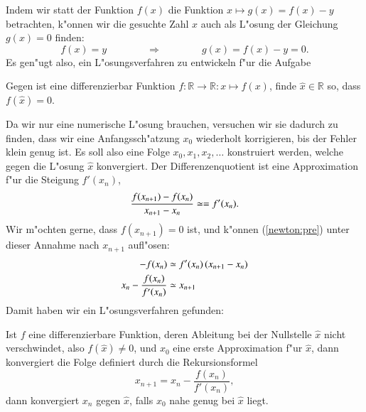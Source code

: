 Indem wir statt der Funktion $f(x)$ die Funktion $x\mapsto g(x)=f(x)-y$
betrachten, k"onnen wir die gesuchte Zahl $x$ auch als L"osung der
Gleichung $g(x)=0$ finden:
\begin{equation}
f(x)=y
\qquad\qquad
\Rightarrow
\qquad\qquad
g(x)=f(x)-y = 0.
\label{newton:reduktion}
\end{equation}
Es gen"ugt also, ein L"osungsverfahren zu entwickeln f"ur die Aufgabe
\begin{aufgabe}
Gegen ist eine differenzierbar Funktion
$f\colon\mathbb R\to\mathbb R:x\mapsto f(x)$,
finde $\hat{x}\in\mathbb R$ so, dass $f(\hat{x})=0$.
\end{aufgabe}
Da wir nur eine numerische L"osung brauchen, versuchen wir sie dadurch
zu finden, dass wir eine Anfangssch"atzung $x_0$ wiederholt korrigieren,
bis der Fehler klein genug ist.
Es soll also eine Folge $x_0,x_1,x_2,\dots$ konstruiert werden, welche
gegen die L"osung $\hat{x}$ konvergiert.
Der Differenzenquotient ist eine Approximation f"ur die Steigung
$f'(x_n)$,
\begin{equation}
\frac{
f(x_{\mathstrut n+1})-f(x_{\mathstrut n})
}{
x_{\mathstrut n+1}-x_{\mathstrut n}
}
\simeq = f'(x_n).
\label{newton:pre}
\end{equation}
Wir m"ochten gerne, dass $f(x_{n+1})=0$ ist, und k"onnen (\ref{newton:pre})
unter dieser Annahme nach $x_{n+1}$ aufl"osen:
\begin{align*}
-f(x_n)
&\simeq
f'(x_n)\,(x_{\mathstrut n+1}-x_{\mathstrut n})
\\
x_{\mathstrut n}-\frac{f(x_n)}{f'(x_n)}
&\simeq x_{\mathstrut n+1}
\end{align*}
Damit haben wir ein L"osungsverfahren gefunden:
\begin{satz}[Newton]
Ist $f$ eine differenzierbare Funktion, deren Ableitung bei der Nullstelle
$\hat{x}$ nicht verschwindet, also $f(\hat{x})\ne 0$, und $x_0$ eine erste
Approximation f"ur $\hat{x}$, dann konvergiert die Folge
definiert durch die Rekursionsformel
\[
x_{n+1}=x_n-\frac{f(x_n)}{f'(x_n)},
\]
dann konvergiert $x_n$ gegen $\hat{x}$, falls $x_0$ nahe genug bei
$\hat{x}$ liegt.
\end{satz}

